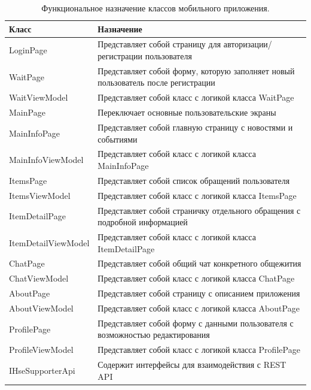 \documentclass{../includes/TechDoc}
\begin{document}
    \begin{table}[ht]
        \caption{\label{tab:classes-table}Функциональное назначение классов мобильного приложения.}
        \centering
        \begin{tabular}{ | l | p{12cm} | }
            \hline
            \textbf{Класс} & \textbf{Назначение}  \\ \hline
            LoginPage & Представляет собой страницу для авторизации/регистрации пользователя \\ \hline
            WaitPage & Представляет собой форму, которую заполняет новый пользователь после регистрации \\ \hline
            WaitViewModel & Представляет собой класс с логикой класса WaitPage \\ \hline
            MainPage & Переключает основные пользовательские экраны \\ \hline
            MainInfoPage & Представляет собой главную страницу с новостями и событиями \\ \hline
            MainInfoViewModel & Представляет собой класс с логикой класса MainInfoPage \\ \hline
            ItemsPage & Представляет собой список обращений пользователя \\ \hline
            ItemsViewModel & Представляет собой класс с логикой класса ItemsPage \\ \hline
            ItemDetailPage & Представляет собой страничку отдельного обращения с подробной информацией \\ \hline
            ItemDetailViewModel & Представляет собой класс с логикой класса ItemDetailPage \\ \hline
            ChatPage & Представляет собой общий чат конкретного общежития \\ \hline
            ChatViewModel & Представляет собой класс с логикой класса ChatPage \\ \hline
            AboutPage & Представляет собой страницу с описанием приложения \\ \hline
            AboutViewModel & Представляет собой класс с логикой класса AboutPage \\ \hline
            ProfilePage & Представляет собой форму с данными пользователя с возможностью редактирования \\ \hline
            ProfileViewModel & Представляет собой класс с логикой класса ProfilePage \\ \hline
            IHseSupporterApi & Содержит интерфейсы для взаимодействия с REST API \\ \hline

\end{tabular}
\end{table}
\end{document}
